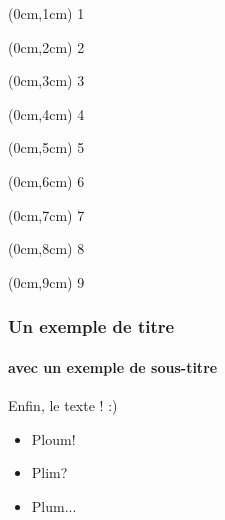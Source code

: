 \documentclass{beamer}
\begin{document}
\begin{frame}
			\begin{textblock*}{0cm}(0cm,1cm)
				1
			\end{textblock*}
			\begin{textblock*}{0cm}(0cm,2cm)
				2
			\end{textblock*}
			\begin{textblock*}{0cm}(0cm,3cm)
				3
			\end{textblock*}
			\begin{textblock*}{0cm}(0cm,4cm)
				4
			\end{textblock*}
			\begin{textblock*}{0cm}(0cm,5cm)
				5
			\end{textblock*}
			\begin{textblock*}{0cm}(0cm,6cm)
				6
			\end{textblock*}
			\begin{textblock*}{0cm}(0cm,7cm)
				7
			\end{textblock*}
			\begin{textblock*}{0cm}(0cm,8cm)
				8
			\end{textblock*}
			\begin{textblock*}{0cm}(0cm,9cm)
				9
			\end{textblock*}
	
			
			\frametitle{Un exemple de titre}
			\framesubtitle{avec un exemple de sous-titre}
			Enfin, le texte ! :)
		\end{frame}
		
		\begin{frame}
			\begin{itemize}
				\item<1,3> Ploum!
				\item<2-4> Plim?
				\item Plum...
			\end{itemize}
		\end{frame}
		
		
	
\end{document}
